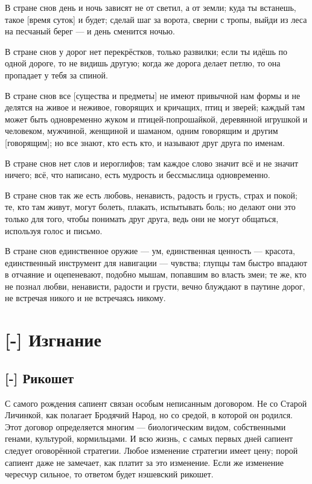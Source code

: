 В стране снов день и ночь зависят не от светил, а от земли;
куда ты встанешь, такое [время суток] и будет;
сделай шаг за ворота, сверни с тропы, выйди из леса на песчаный берег --- и день сменится ночью.

В стране снов у дорог нет перекрёстков, только развилки;
если ты идёшь по одной дороге, то не видишь другую;
когда же дорога делает петлю, то она пропадает у тебя за спиной.

В стране снов все [существа и предметы] не имеют привычной нам формы и не делятся на живое и неживое, говорящих и кричащих\FM, птиц и зверей;
каждый там может быть одновременно жуком и птицей-попрошайкой, деревянной игрушкой и человеком, мужчиной, женщиной и шаманом, одним говорящим и другим [говорящим];
но все знают, кто есть кто, и называют друг друга по именам.

В стране снов нет слов и иероглифов;
там каждое слово значит всё и не значит ничего;
всё, что написано, есть мудрость и бессмыслица одновременно.

В стране снов так же есть любовь, ненависть, радость и грусть, страх и покой;
те, кто там живут, могут болеть, плакать, испытывать боль;
но делают они это только для того, чтобы понимать друг друга, ведь они не могут общаться, используя голос и письмо.

В стране снов единственное оружие --- ум, единственная ценность --- красота, единственный инструмент для навигации --- чувства;
глупцы там быстро впадают в отчаяние и оцепеневают, подобно мышам, попавшим во власть змеи;
те же, кто не познал любви, ненависти, радости и грусти, вечно блуждают в паутине дорог, не встречая никого и не встречаясь никому.

\chapter{[-] Изгнание}

\section{[-] Рикошет}

С самого рождения сапиент связан особым неписанным договором.
Не со Старой Личинкой, как полагает Бродячий Народ, но со средой, в которой он родился.
Этот договор определяется многим --- биологическим видом, собственными генами, культурой, кормильцами.
И всю жизнь, с самых первых дней сапиент следует оговорённой стратегии.
Любое изменение стратегии имеет цену;
порой сапиент даже не замечает, как платит за это изменение.
Если же изменение чересчур сильное, то ответом будет нэшевский рикошет.

